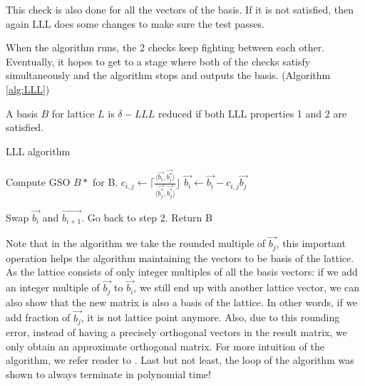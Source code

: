 \begin{description}
\begin{description}
                    This check is also done for all the vectors of the basis. If
                    it is not satisfied, then again LLL does some changes to
                    make sure the test passes.
            \end{description}

            When the algorithm runs, the 2 checks keep fighting between each
            other. Eventually, it hopes to get to a stage where both of the
            checks satisfy simultaneously and the algorithm stops and outputs
            the basis. (Algorithm \ref{alg:LLL})

            \begin{definition}
                A basis $B$ for lattice $L$ is $\delta-LLL$ reduced if both LLL
                properties 1 and 2 are satisfied.
                \label{def:LLL}
            \end{definition}

            \begin{algorithm}
            \caption{LLL algorithm}
                \label{alg:LLL}
                \begin{algorithmic}[1]
                    \State Compute GSO $B*$ for B.
                        \State $c_{i,j} \gets \lceil{\frac{\langle \vec{b_i},
                        \vec{b_j^*} \rangle}{\langle \vec{b_j^*},\vec{b_j^*}\rangle}}\rfloor$
                        \State $\vec{b_i} \gets \vec{b_i} - c_{i,j}\vec{b_j}$
                        \EndFor
                    \EndFor

                        \State Swap $\vec{b_i}$ and $\vec{b_{i+1}}$.
                        \State Go back to step 2.
                    \Else
                        \State Return B
                    \EndIf
                    \EndProcedure
                \end{algorithmic}
            \end{algorithm}


            Note that in the algorithm we take the rounded multiple of
            $\vec{b_j}$, this important operation helps the algorithm
            maintaining the vectors to be basis of the lattice. As the lattice
            consists of only integer multiples of all the basis vectors: if we
            add an integer multiple of $\vec{b_j}$ to $\vec{b_i}$, we still end
            up with another lattice vector, we can also show that the new matrix
            is also a basis of the lattice. In other words, if we add fraction of
            $\vec{b_j}$, it is not lattice point anymore. Also, due to this
            rounding error, instead of having a precisely orthogonal vectors in
            the result matrix, we only obtain an approximate orthogonal matrix.
            For more intuition of the algorithm, we refer reader to
            \cite{lenstra1982factoring}. Last but not least, the loop of the algorithm was shown
            to always terminate in polynomial time!


\end{description}
